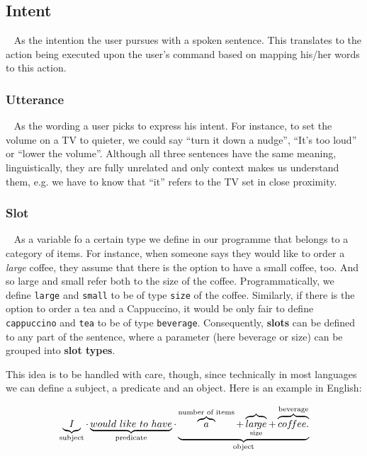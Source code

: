 	\subsection*{Intent}~\label{intents}
	As the intention the user pursues with a spoken sentence. This translates to the action being executed upon the user's command based on mapping his/her words to this action.
	
	\subsubsection*{Utterance}~\label{utterances}
	As the wording a user picks to express his intent. For instance, to set the volume on a TV to quieter, we could say ``turn it down a nudge'', ``It's too loud'' or ``lower the volume''. Although all three sentences have the same meaning, linguistically, they are fully unrelated and only context makes us understand them, e.g. we have to know that ``it'' refers to the TV set in close proximity.
	
	\subsubsection*{Slot}~\label{slots}
	As a variable fo a certain type we define in our programme that belongs to a category of items. For instance, when someone says they would like to order a \textit{large} coffee, they assume that there is the option to have a small coffee, too. And so large and small refer both to the size of the coffee. Programmatically, we define \texttt{large} and \texttt{small} to be of type \texttt{size} of the coffee. Similarly, if there is the option to order a tea and a Cappuccino, it would be only fair to define \texttt{cappuccino} and \texttt{tea} to be of type \texttt{beverage}. Consequently, \textbf{slots} can be defined to any part of the sentence, where a parameter (here beverage or size) can be grouped into \textbf{slot types}. 



	This idea is to be handled with care, though, since technically in most languages we can define a subject, a predicate and an object. Here is an example in English:
	
	\[
	\underbrace{I}_\text{subject} \cdot
	\underbrace{would \ like  \ to \ have}_\text{predicate} \cdot
	\underbrace{
		\overbrace{{a}}^\text{number of items} +		
		\overbrace{lar\!ge}_\text{size} +
		\overbrace{cof \mkern-3mu fee.}^\text{beverage}
	}_\text{object} 
	\]
	
